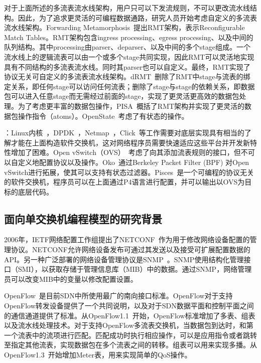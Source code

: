 \documentclass{ctexart}
\newcommand{\para}[1]{\smallskip\noindent {\bf #1}}
\begin{document}
对于上面所述的多流表流水线架构，用户只可以下发流规则，不可以更改流水线结构。因此，为了追求更灵活的可编程数据通路，研究人员开始考虑自定义的多流表流水线架构。Forwarding Metamorphosis~\cite{rmt}提出RMT架构，表示Reconfigurable Match Tables。RMT架构包含ingress processing、egress processing、以及中间的队列结构。其中processing由parser、deparser、以及中间的多个stage组成。一个流水线上的逻辑流表可以由一个或多个stage共同实现，因此RMT可以灵活地实现具有不同结构的多流表流水线。同时其parser也可以自定义。最终，RMT实现了协议无关可自定义的多流表流水线架构。dRMT~\cite{chole2017drmt}删除了RMT中stage与流表的绑定关系，即任何stage可以访问任何流表；删除了stage与stage的依赖关系，即数据包可以进入任意stage而无需经过前面的stage，实现了更灵活更高效的数据包处理。为了考虑更丰富的数据包操作，PISA~\cite{pisa}概括了RMT架构并实现了更灵活的数据包操作指令（atoms）。OpenState~\cite{bianchi2014openstate}考虑了有状态的操作。

\para{基于软件的可编程数据通路}：Linux内核~\cite{linux}，DPDK~\cite{dpdk}，Netmap~\cite{rizzo2012netmap}，Click~\cite{kohler2000click}等工作需要对底层实现具有相当的了解才能在上面构造软件交换机，这对网络程序员需要快速适应这些平台并开发新特性增加了困难。Open vSwitch（OVS）~\cite{pfaff2015design}考虑了向其添加流表规则的接口，但不可以自定义地配置协议以及操作。Oko~\cite{chaignon2018oko}通过Berkeley Packet Filter (BPF) 对Open vSwitch进行拓展，使其可以支持有状态过滤器。Pisces~\cite{shahbaz2016pisces}是一个可编程的协议无关的软件交换机，程序员可以在上面通过P4语言进行配置，并可以输出以OVS为目标的底层代码。


\subsection{面向单交换机编程模型的研究背景}

2006年，IETF网络配置工作组提出了NETCONF~\cite{enns2006netconf}作为用于修改网络设备配置的管理协议。NETCONF允许网络设备发布可通过其发送以及接受可扩展配置数据的API。另一种广泛部署的网络设备管理协议是SNMP~\cite{hare2011simple}。SNMP使用结构化管理接口（SMI），以获取存储于管理信息库（MIB）中的数据。通过SNMP，网络管理员可以改变MIB中的变量以修改配置设置。

OpenFlow~\cite{mckeown2008openflow}是目前SDN中所使用最广的南向接口标准。OpenFlow对于支持OpenFlow转发设备提供了一个共同说明，以及对于SDN数据平面和控制平面之间的通信通道提供了标准。从OpenFlow1.1~\cite{openflow1-1}开始，OpenFlow标准增加了多表、组表以及流水线处理技术。对于支持OpenFlow多流表交换机，当数据包到达时，和第一个流表中的流项进行匹配。匹配成功时执行相应操作，可以是应用指令或者跳转至指定其他流表，实现数据包在多个流表之间的转移。组表可以用来实现多播。从OpenFlow1.3~\cite{openflow1-3}开始增加Meter表，用来实现简单的QoS操作。
\end{document}

